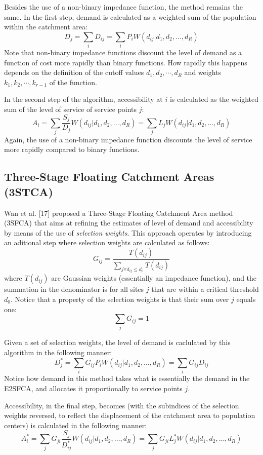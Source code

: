 \documentclass[10pt,letterpaper]{article}
\begin{document}
Besides the use of a non-binary impedance function, the method remains
the same. In the first step, demand is calculated as a weighted sum of
the population within the catchment area: \[
D_j = \sum_i{D_{ij}} = \sum_i{P_iW(d_{ij}|d_1, d_2, \dots, d_R)}
\] Note that non-binary impedance functions discount the level of demand
as a function of cost more rapidly than binary functions. How rapidly
this happens depends on the definition of the cutoff values
\(d_1, d_2, \cdots, d_R\) and weights \(k_1, k_2, \cdots, k_{r-1}\) of
the function.

In the second step of the algorithm, accessibility at \(i\) is
calculated as the weighted sum of the level of service of service points
\(j\): \[
A_i = \sum_j{\frac{S_j}{D_j}W(d_{ij}|d_1, d_2, \dots, d_R)} = \sum_j{L_jW(d_{ij}|d_1, d_2, \dots, d_R)}
\] Again, the use of a non-binary impedance function discounts the level
of service more rapidly compared to binary functions.

\subsection{Three-Stage Floating Catchment Areas
(3STCA)}\label{three-stage-floating-catchment-areas-3stca}

Wan et al. {[}17{]} proposed a Three-Stage Floating Catchment Area
method (3SFCA) that aims at refining the estimates of level of demand
and accessibility by means of the use of \emph{selection weights}. This
approach operates by introducing an aditional step where selection
weights are calculated as follows: \[
G_{ij}=\frac{T(d_{ij})}{\sum_{j \forall d_{ij} \le d_0}T(d_{ij})}
\] where \(T(d_{ij})\) are Gaussian weights (essentially an impedance
function), and the summation in the denominator is for all sites \(j\)
that are within a critical threshold \(d_0\). Notice that a property of
the selection weights is that their sum over \(j\) equals one: \[
\sum_j G_{ij}=1
\]

Given a set of selection weights, the level of demand is caclulated by
this algorithm in the following manner: \[
D^*_j = \sum_i G_{ij}P_iW(d_{ij}|d_1, d_2, \dots, d_R) = \sum_i G_{ij}D_{ij}
\] Notice how demand in this method takes what is essentially the demand
in the E2SFCA, and allocates it proportionally to service points \(j\).

Accessibility, in the final step, becomes (with the subindices of the
selection weights reversed, to reflect the displacement of the catchment
area to population centers) is calculated in the following manner: \[
A^*_i = \sum_j G_{ji}\frac{S_j}{D^*_{ij}}W(d_{ij}|d_1, d_2, \dots, d_R) = \sum_jG_{ji}L^*_jW(d_{ij}|d_1, d_2, \dots, d_R)
\]
\end{document}
